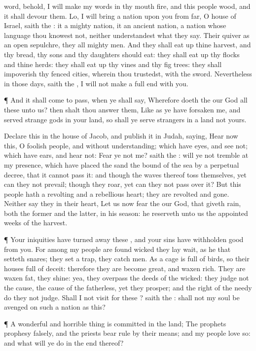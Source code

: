 {word, behold, I will
make my
words in thy
mouth
fire, and this
people
wood, and it shall
devour them.
Lo, I will
bring a
nation upon you from
far, O
house of
Israel,
saith the
{}: it
{} a
mighty
nation, it
{} an
ancient
nation, a
nation whose
language thou
knowest not, neither
understandest what they
say.
Their
quiver
{} as an
open
sepulchre, they
{} all mighty
men.
And they shall eat
up thine
harvest, and thy
bread,
{} thy
sons and thy
daughters should
eat: they shall eat
up thy
flocks and thine
herds: they shall eat
up thy
vines and thy fig
trees: they shall
impoverish thy
fenced
cities, wherein
thou
trustedst, with the
sword.
Nevertheless in those
days,
saith the
{}, I will not
make a full
end with you.
\par }{\PP {}¶ And it shall come to pass, when ye shall
say,
Wherefore
doeth the
{} our
God all these
{} unto us? then shalt thou
answer them, Like as ye have
forsaken me, and
served
strange
gods in your
land, so shall ye
serve
strangers in a
land
{} not yours.
\par }{\PP {}Declare this in the
house of
Jacob, and
publish it in
Judah,
saying,
Hear now this, O
foolish
people, and without
understanding; which have
eyes, and
see not; which have
ears, and
hear not:
Fear ye not me?
saith the
{}: will ye not
tremble at my
presence, which have
placed the
sand
{} the
bound of the
sea by a
perpetual
decree, that it cannot
pass it: and though the
waves thereof
toss themselves, yet can they not
prevail; though they
roar, yet can they not pass
over it?
But this
people hath a
revolting and a
rebellious
heart; they are
revolted and
gone.
Neither
say they in their
heart, Let us now
fear the
{} our
God, that
giveth
rain, both the
former and the
latter, in his
season: he
reserveth unto us the
appointed
weeks of the
harvest.
\par }{\PP {}¶ Your
iniquities have turned
away these
{}, and your
sins have
withholden
good
{} from you.
For among my
people are
found
wicked
{} they lay
wait, as he that
setteth
snares; they
set a
trap, they
catch
men.
As a
cage is
full of
birds, so
{} their
houses
full of
deceit: therefore they are become
great, and waxen
rich.
They are waxen
fat, they
shine: yea, they
overpass the
deeds of the
wicked: they
judge not the
cause, the cause of the
fatherless, yet they
prosper; and the
right of the
needy do they not
judge.
Shall I not
visit for these
{}?
saith the
{}: shall not my
soul be
avenged on such a
nation as this?
\par }{\PP {}¶ A
wonderful and horrible
thing is
committed in the
land;
The
prophets
prophesy
falsely, and the
priests bear
rule by their
means; and my
people
love
{} so: and what will ye
do in the
end thereof?

}
